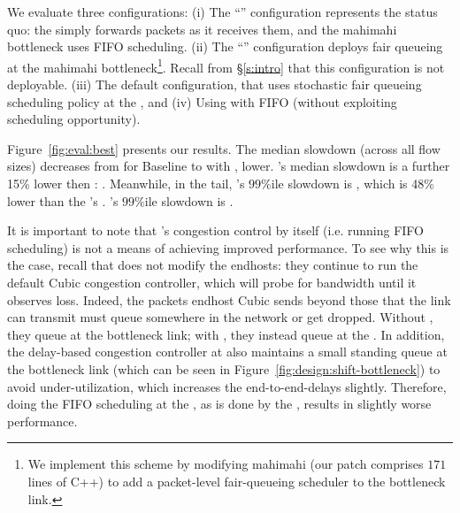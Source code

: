 We evaluate three configurations: 
(i) The ``\baseline'' configuration represents the status quo: the \inbox simply forwards packets as it receives them, and the mahimahi bottleneck uses FIFO scheduling.
(ii) The ``\optimal'' configuration deploys fair queueing
at the mahimahi bottleneck\footnote{
We implement this scheme by modifying mahimahi (our patch comprises $171$ lines of C++) to add a packet-level fair-queueing scheduler to the bottleneck link.}. 
Recall from \S\ref{s:intro} that this configuration is not deployable.
(iii) The default \name configuration, that uses stochastic fair queueing~\cite{sfq} scheduling policy at the \inbox, and (iv) Using \name with FIFO (without exploiting scheduling opportunity).

Figure~\ref{fig:eval:best} presents our results. 
The median slowdown (across all flow sizes) decreases from \overviewBenefitsBaselineMedian 
for Baseline to \overviewBenefitsBundlerMedian 
with \name, \overviewBenefitsBundlerMedianImprovement
lower. 
\optimal's median slowdown is a further 15\% lower then \name: \overviewBenefitsOptimalMedian.
Meanwhile, in the tail, \name's $99\%$ile slowdown is \overviewBenefitsBundlerTail, which is 48\% lower than the \baseline's \overviewBenefitsBaselineTail. \optimal's $99\%$ile slowdown is \overviewBenefitsOptimalTail.

 It is important to note that \name's congestion control by itself (i.e. running FIFO scheduling) is not a means of achieving improved performance. 
To see why this is the case, recall that \name does not modify the endhosts: they continue to run the default Cubic congestion controller, which will probe for bandwidth until it observes loss.
Indeed, the packets endhost Cubic sends beyond those that the link can transmit must queue somewhere in the network or get dropped. 
Without \name, they queue at the bottleneck link;
with \name, they instead queue at the \inbox. 
In addition, the delay-based congestion controller at \inbox also maintains a small standing queue at the bottleneck link (which can be seen in Figure~\ref{fig:design:shift-bottleneck}) to avoid under-utilization, which increases the end-to-end-delays slightly. 
Therefore, doing the FIFO scheduling at the \name, as is done by the \baseline, results in slightly worse performance.

